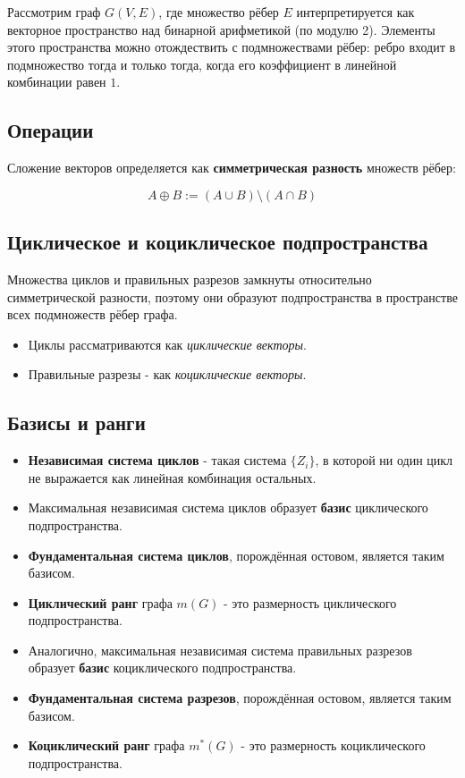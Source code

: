 {Рассмотрим граф $G(V, E)$, где множество рёбер $E$ интерпретируется как векторное пространство над бинарной арифметикой (по модулю 2).  
Элементы этого пространства можно отождествить с подмножествами рёбер: ребро входит в подмножество тогда и только тогда, когда его коэффициент в линейной комбинации равен $1$.

\subsection*{Операции}

Сложение векторов определяется как \textbf{симметрическая разность} множеств рёбер:


\[
A \oplus B := (A \cup B) \setminus (A \cap B)
\]



\subsection*{Циклическое и коциклическое подпространства}

Множества циклов и правильных разрезов замкнуты относительно симметрической разности, поэтому они образуют подпространства в пространстве всех подмножеств рёбер графа.

\begin{itemize}
  \item Циклы рассматриваются как \emph{циклические векторы}.
  \item Правильные разрезы - как \emph{коциклические векторы}.
\end{itemize}

\subsection*{Базисы и ранги}

\begin{itemize}
  \item \textbf{Независимая система циклов} - такая система $\{Z_i\}$, в которой ни один цикл не выражается как линейная комбинация остальных.
  \item Максимальная независимая система циклов образует \textbf{базис} циклического подпространства.
  \item \textbf{Фундаментальная система циклов}, порождённая остовом, является таким базисом.
  \item \textbf{Циклический ранг} графа $m(G)$ - это размерность циклического подпространства.

  \item Аналогично, максимальная независимая система правильных разрезов образует \textbf{базис} коциклического подпространства.
  \item \textbf{Фундаментальная система разрезов}, порождённая остовом, является таким базисом.
  \item \textbf{Коциклический ранг} графа $m^*(G)$ - это размерность коциклического подпространства.
\end{itemize}



    \newpage
}
